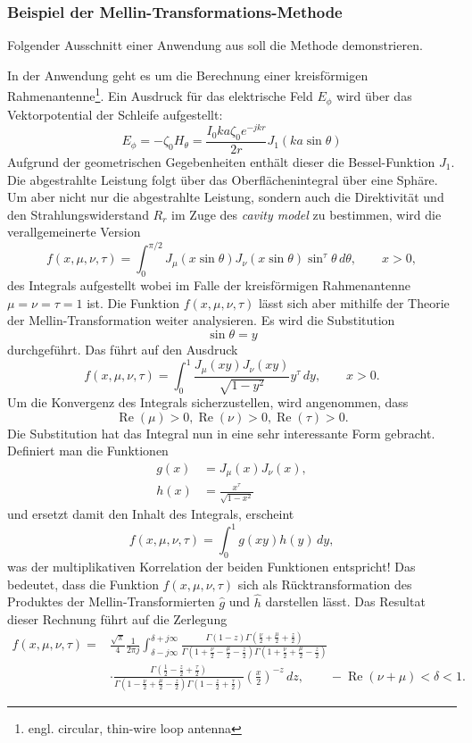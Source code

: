 \subsubsection{Beispiel der Mellin-Transformations-Methode}
Folgender Ausschnitt einer Anwendung aus 
\cite{mellin:mellin-transform-method} soll die Methode demonstrieren.

In der Anwendung geht es um die Berechnung einer kreisförmigen 
Rahmenantenne\footnote{engl. circular, thin-wire loop antenna}.
Ein Ausdruck für das elektrische Feld $E_\phi $ wird über das 
Vektorpotential der Schleife aufgestellt:
\[
    E_\phi 
    = -\zeta_0 H_\theta  
    = \frac{I_0ka\zeta_0e^{-jkr}}{2r} J_1(ka \sin\theta)
\]
Aufgrund der geometrischen Gegebenheiten enthält dieser die 
Bessel-Funktion $J_1$.
Die abgestrahlte Leistung folgt über das Oberflächenintegral 
über eine Sphäre.
Um aber nicht nur die abgestrahlte Leistung, sondern auch die 
Direktivität und den Strahlungswiderstand $R_r$ im Zuge des 
{\em cavity model} zu bestimmen, wird die verallgemeinerte Version 
\[
    f(x, \mu, \nu, \tau)
    = \int_{0}^{\pi/2} J_\mu(x \sin\theta) J_\nu(x \sin\theta) 
    \sin^\tau \theta \,d\theta, \qquad x > 0 
    ,
\]
des Integrals aufgestellt wobei im Falle der kreisförmigen 
Rahmenantenne $\mu = \nu = \tau = 1$ ist.
Die Funktion $f(x, \mu, \nu, \tau)$ lässt sich aber mithilfe der 
Theorie der Mellin-Transformation weiter analysieren.
Es wird die Substitution
\[
    \sin\theta = y
\]
durchgeführt.
Das führt auf den Ausdruck
\[
    f(x, \mu, \nu, \tau)
    = \int_{0}^{1} \frac{J_\mu(xy) J_\nu(xy)}{\sqrt{1-y^2}} y^\tau \,dy, 
    \qquad x > 0 
    .
\]
Um die Konvergenz des Integrals sicherzustellen, wird angenommen, dass
\[
    \operatorname{Re}(\mu) > 0,
    \operatorname{Re}(\nu) > 0,
    \operatorname{Re}(\tau) > 0.
\]
Die Substitution hat das Integral nun in eine sehr 
interessante Form gebracht.
Definiert man die Funktionen 
\begin{align*}
    g(x) &= J_\mu(x)J_\nu(x), \\
    h(x) &= \frac{x^\tau}{\sqrt{1-x^2}} 
\end{align*}
und ersetzt damit den Inhalt des Integrals, erscheint
\[
    f(x, \mu, \nu, \tau)
    = \int_{0}^{1} g(xy) h(y) \,dy, 
\]
was der multiplikativen Korrelation der beiden Funktionen entspricht!
Das bedeutet, dass die Funktion $f(x, \mu, \nu, \tau)$ sich als 
Rücktransformation des Produktes der Mellin-Transformierten $\hat{g}$ 
und $\hat{h}$ darstellen lässt.
Das Resultat dieser Rechnung führt auf die Zerlegung 
\begin{align*}
    f(x, \mu, \nu, \tau)
    = &\frac{\sqrt{\pi}}{4} \frac{1}{2\pi j} 
    \int_{\delta -j\infty}^{\delta +j\infty} 
    \frac{\Gamma(1 - z)\Gamma(\frac{\nu}{2}+\frac{\mu}{2}+\frac{z}{2})}{\Gamma(1+\frac{\nu}{2}-\frac{\mu}{2}-\frac{z}{2}) \Gamma(1+\frac{\nu}{2}+\frac{\mu}{2}-\frac{z}{2})} \\
    &\cdot \frac{\Gamma(\frac{1}{2}-\frac{z}{2}+\frac{\tau}{2})}{\Gamma(1-\frac{\nu}{2}+\frac{\mu}{2}-\frac{z}{2})\Gamma(1-\frac{z}{2}+\frac{\tau}{2})} 
    \left(\frac{x}{2}\right)^{-z} \,dz,
    \qquad -\operatorname{Re}(\nu + \mu) < \delta < 1
    .
\end{align*}
